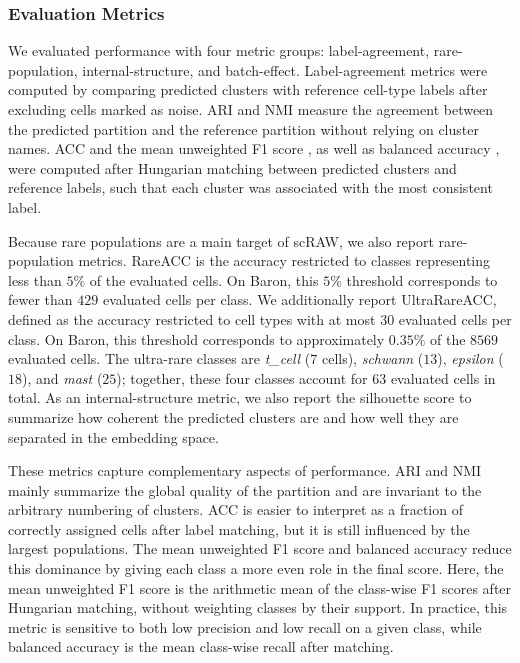 \documentclass[11pt,a4paper]{article}
\begin{document}
\subsubsection*{Evaluation Metrics}

We evaluated performance with four metric groups: label-agreement, rare-population, internal-structure, and
batch-effect. Label-agreement metrics were computed by
comparing predicted clusters with reference cell-type labels after
excluding cells marked as noise. ARI \cite{hubert1985} and NMI
\cite{vinh2010} measure the agreement between the predicted partition
and the reference partition without relying on cluster names. ACC and
the mean unweighted F1 score \cite{sokolova2009}, as well as balanced accuracy
\cite{brodersen2010}, were computed after Hungarian matching between
predicted clusters and reference labels, such that each cluster was
associated with the most consistent label.

Because rare populations are a main target of scRAW, we also report
rare-population metrics. RareACC is the accuracy restricted to classes
representing less than $5\%$ of the evaluated cells. On Baron, this
$5\%$ threshold corresponds to fewer than $429$ evaluated cells per
class. We additionally report UltraRareACC, defined as the accuracy
restricted to cell types with at most $30$ evaluated cells per class.
On Baron, this threshold corresponds to approximately $0.35\%$ of the
$8569$ evaluated cells. The ultra-rare classes are
\textit{t\_cell} ($7$ cells), \textit{schwann} ($13$),
\textit{epsilon} ($18$), and \textit{mast} ($25$); together, these
four classes account for $63$ evaluated cells in total. As an internal-structure
metric, we also report the silhouette score to summarize how coherent
the predicted clusters are and how well they are separated in the
embedding space.

These metrics capture complementary aspects of performance. ARI and NMI mainly summarize the global quality of the partition and are invariant to the arbitrary numbering of clusters. ACC is easier to interpret as a fraction of correctly assigned cells after label matching, but it is still influenced by the largest populations. The mean unweighted F1 score and balanced accuracy reduce this dominance by giving each class a more even role in the final score. Here, the mean unweighted F1 score is the arithmetic mean of the class-wise F1 scores after Hungarian matching, without weighting classes by their support. In practice, this metric is sensitive to both low precision and low recall on a given class, while balanced accuracy is the mean class-wise recall after matching.
\end{document}
